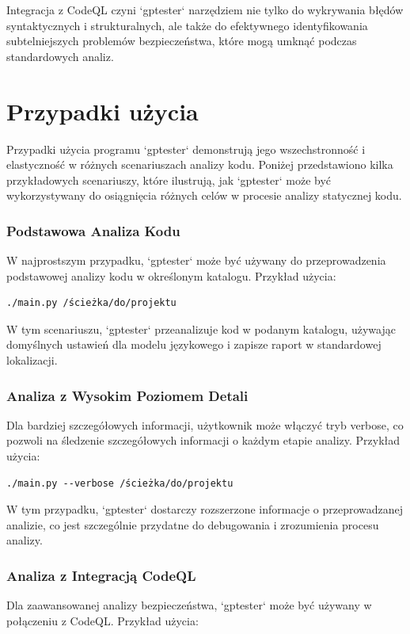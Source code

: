 Integracja z CodeQL czyni `gptester` narzędziem nie tylko do wykrywania błędów syntaktycznych i strukturalnych, ale także do efektywnego identyfikowania subtelniejszych problemów bezpieczeństwa, które mogą umknąć podczas standardowych analiz.

\section{Przypadki użycia}
\label{sec:przypadki_uzycia}

Przypadki użycia programu `gptester` demonstrują jego wszechstronność i elastyczność w różnych scenariuszach analizy kodu. Poniżej przedstawiono kilka przykładowych scenariuszy, które ilustrują, jak `gptester` może być wykorzystywany do osiągnięcia różnych celów w procesie analizy statycznej kodu.

\subsubsection{Podstawowa Analiza Kodu}
W najprostszym przypadku, `gptester` może być używany do przeprowadzenia podstawowej analizy kodu w określonym katalogu. Przykład użycia:

\begin{verbatim}
./main.py /ścieżka/do/projektu
\end{verbatim}

W tym scenariuszu, `gptester` przeanalizuje kod w podanym katalogu, używając domyślnych ustawień dla modelu językowego i zapisze raport w standardowej lokalizacji.

\subsubsection{Analiza z Wysokim Poziomem Detali}
Dla bardziej szczegółowych informacji, użytkownik może włączyć tryb verbose, co pozwoli na śledzenie szczegółowych informacji o każdym etapie analizy. Przykład użycia:

\begin{verbatim}
./main.py --verbose /ścieżka/do/projektu
\end{verbatim}

W tym przypadku, `gptester` dostarczy rozszerzone informacje o przeprowadzanej analizie, co jest szczególnie przydatne do debugowania i zrozumienia procesu analizy.

\subsubsection{Analiza z Integracją CodeQL}
Dla zaawansowanej analizy bezpieczeństwa, `gptester` może być używany w połączeniu z CodeQL. Przykład użycia:

